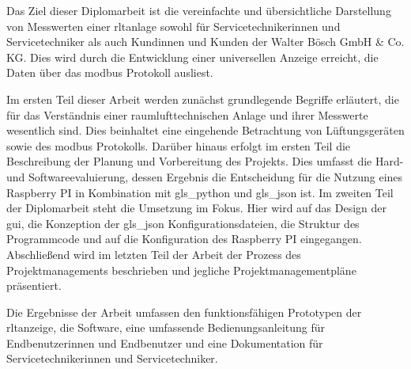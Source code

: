Das Ziel dieser Diplomarbeit ist die vereinfachte und übersichtliche Darstellung von Messwerten einer \acf{rltanlage} sowohl für Servicetechnikerinnen und Servicetechniker als auch Kundinnen und Kunden der Walter Bösch GmbH \& Co. KG. Dies wird durch die Entwicklung einer universellen Anzeige erreicht, die Daten über das \gls{modbus} Protokoll ausliest. 

Im ersten Teil dieser Arbeit werden zunächst grundlegende Begriffe erläutert, die für das Verständnis einer raumlufttechnischen Anlage und ihrer Messwerte wesentlich sind. Dies beinhaltet eine eingehende Betrachtung von Lüftungsgeräten sowie des \gls{modbus} Protokolls. Darüber hinaus erfolgt im ersten Teil die Beschreibung der Planung und Vorbereitung des Projekts. Dies umfasst die Hard- und Softwareevaluierung, dessen Ergebnis die Entscheidung für die Nutzung eines Raspberry PI in Kombination mit \gls{gls_python} und \gls{gls_json} ist. 
\newline Im zweiten Teil der Diplomarbeit steht die Umsetzung im Fokus. Hier wird auf das Design der \acf{gui}, die Konzeption der \gls{gls_json} Konfigurationsdateien, die Struktur des Programmcode und auf die Konfiguration des Raspberry PI eingegangen. 
\newline Abschließend wird im letzten Teil der Arbeit der Prozess des Projektmanagements beschrieben und jegliche Projektmanagementpläne präsentiert.

Die Ergebnisse der Arbeit umfassen den funktionsfähigen Prototypen der \acs{rltanzeige}, die Software, eine umfassende Bedienungsanleitung für Endbenutzerinnen und Endbenutzer und eine Dokumentation für Servicetechnikerinnen und Servicetechniker.
















